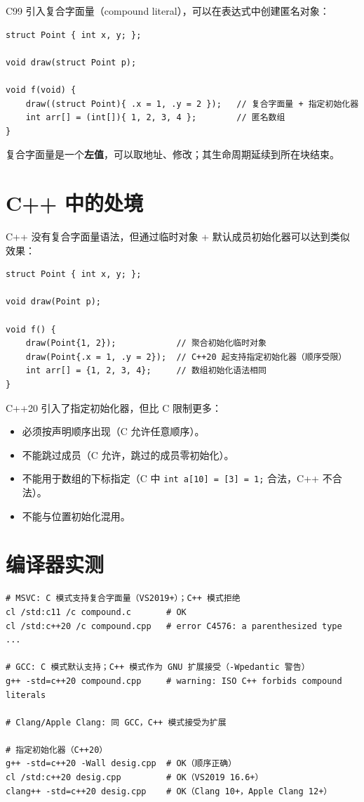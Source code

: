 \documentclass[12pt,a4paper,fontset=fandol]{ctexbook}
\newcommand{\cpplabel}{%
  \tcbox[on line,colback=cppheadbg,colframe=cppheadbg,
    boxrule=0pt,arc=1pt,left=2pt,right=2pt,top=1pt,bottom=1pt,
    colupper=white,fontupper=\scriptsize\bfseries]{C++}}
\newcommand{\clabel}{%
  \tcbox[on line,colback=cheadbg,colframe=cheadbg,
    boxrule=0pt,arc=1pt,left=2pt,right=2pt,top=1pt,bottom=1pt,
    colupper=white,fontupper=\scriptsize\bfseries]{C}}
\newcommand{\shelllabel}{%
  \tcbox[on line,colback=bashheadbg,colframe=bashheadbg,
    boxrule=0pt,arc=1pt,left=2pt,right=2pt,top=1pt,bottom=1pt,
    colupper=white,fontupper=\scriptsize\bfseries]{Shell}}
\newcommand{\cpp}[1]{C++#1}
\newcommand{\kw}[1]{\texttt{#1}}
\begin{document}
C99 引入复合字面量（compound literal），可以在表达式中创建匿名对象：

\clabel{}
\begin{lstlisting}[style=cstyle]
struct Point { int x, y; };

void draw(struct Point p);

void f(void) {
    draw((struct Point){ .x = 1, .y = 2 });   // 复合字面量 + 指定初始化器
    int arr[] = (int[]){ 1, 2, 3, 4 };        // 匿名数组
}
\end{lstlisting}

复合字面量是一个\textbf{左值}，可以取地址、修改；其生命周期延续到所在块结束。

\section{C++ 中的处境}

\cpp{} 没有复合字面量语法，但通过临时对象 + 默认成员初始化器可以达到类似效果：

\cpplabel{}
\begin{lstlisting}
struct Point { int x, y; };

void draw(Point p);

void f() {
    draw(Point{1, 2});            // 聚合初始化临时对象
    draw(Point{.x = 1, .y = 2});  // C++20 起支持指定初始化器（顺序受限）
    int arr[] = {1, 2, 3, 4};     // 数组初始化语法相同
}
\end{lstlisting}

C++20 引入了指定初始化器，但比 C 限制更多：
\begin{itemize}
  \item 必须按声明顺序出现（C 允许任意顺序）。
  \item 不能跳过成员（C 允许，跳过的成员零初始化）。
  \item 不能用于数组的下标指定（C 中 \kw{int a[10] = {[3] = 1};} 合法，\cpp{} 不合法）。
  \item 不能与位置初始化混用。
\end{itemize}

\section{编译器实测}

\shelllabel{}
\begin{lstlisting}[style=bashstyle]
# MSVC: C 模式支持复合字面量（VS2019+）；C++ 模式拒绝
cl /std:c11 /c compound.c       # OK
cl /std:c++20 /c compound.cpp   # error C4576: a parenthesized type ...

# GCC: C 模式默认支持；C++ 模式作为 GNU 扩展接受（-Wpedantic 警告）
g++ -std=c++20 compound.cpp     # warning: ISO C++ forbids compound literals

# Clang/Apple Clang: 同 GCC，C++ 模式接受为扩展

# 指定初始化器（C++20）
g++ -std=c++20 -Wall desig.cpp  # OK（顺序正确）
cl /std:c++20 desig.cpp         # OK（VS2019 16.6+）
clang++ -std=c++20 desig.cpp    # OK（Clang 10+，Apple Clang 12+）
\end{lstlisting}
\end{document}
